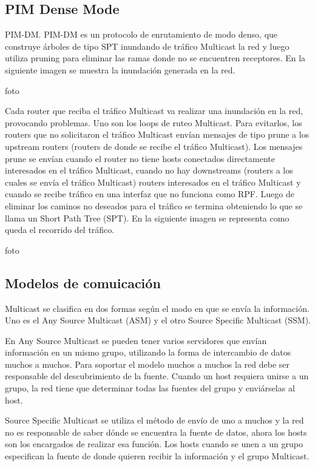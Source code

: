 \documentclass[12pt,a4paper,oneside]{book}
\begin{document}
\subsection{PIM Dense Mode}

PIM-DM.
	PIM-DM es un protocolo de enrutamiento de modo denso, que construye árboles de tipo SPT inundando de tráfico Multicast la red y luego utiliza  pruning para eliminar las ramas donde no se encuentren receptores. 
	En la siguiente imagen se muestra la inundación generada en la red.

foto

Cada router que reciba el tráfico Multicast va realizar una inundación en la red, provocando problemas. Uno son los loops de ruteo Multicast. Para evitarlos, los routers que no solicitaron el tráfico Multicast envían mensajes de tipo prune a los upstream routers (routers de donde se recibe el tráfico Multicast). Los mensajes prune se envían cuando el router no tiene hosts conectados directamente interesados en el tráfico Multicast, cuando no hay downstreams (routers a los cuales se envía el tráfico Multicast) routers interesados en el tráfico Multicast y cuando se recibe tráfico en una interfaz que no funciona como RPF.
	Luego de eliminar los caminos no deseados para el tráfico se termina obteniendo lo que se llama un Short Path Tree (SPT). En la siguiente imagen se representa como queda el recorrido del tráfico.


foto

\subsection{Modelos de comuicación}

Multicast se clasifica en dos formas según el modo en que se envía la información. Uno es el Any Source Multicast (ASM) y el otro Source Specific Multicast (SSM). 
	
En Any Source Multicast se pueden tener varios servidores que envían información en un mismo grupo, utilizando la forma de intercambio de datos muchos a muchos. Para soportar el modelo muchos a muchos la red debe ser responsable del descubrimiento de la fuente. Cuando un host requiera unirse a un grupo, la red tiene que determinar todas las fuentes del grupo y enviárselas al host.
	
Source Specific Multicast se utiliza el método de envío de uno a muchos y la red no es responsable de saber dónde se encuentra la fuente de datos, ahora los hosts son los encargados de realizar esa función. Los hosts cuando se unen a un grupo especifican la fuente de donde quieren recibir la información y el grupo Multicast.
	
\end{document}
